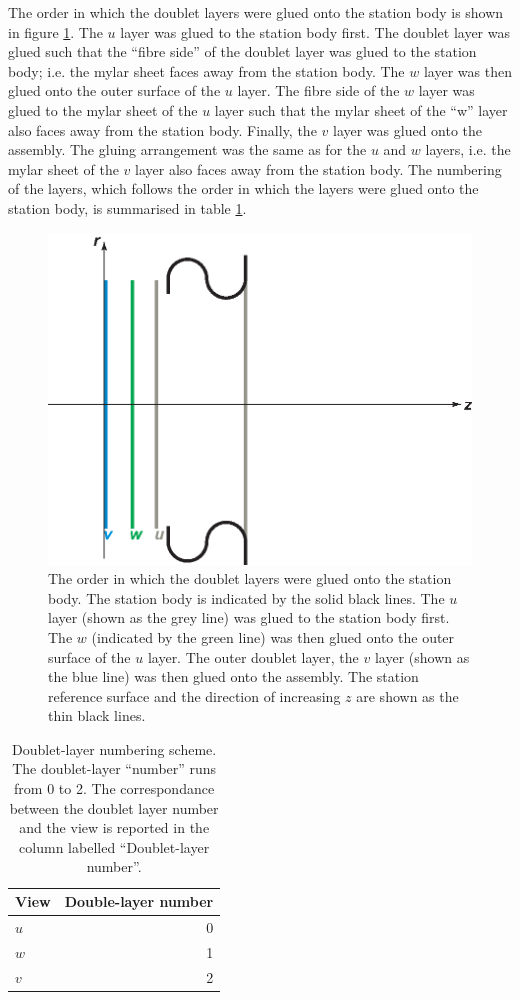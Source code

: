 The order in which the doublet layers were glued onto the station body
is shown in figure \ref{Fig:DblLyrOrder}.
The $u$ layer was glued to the station body first.
The doublet layer was glued such that the ``fibre side'' of the
doublet layer was glued to the station body; i.e. the mylar sheet
faces away from the station body.
The $w$ layer was then glued onto the outer surface of the $u$ layer.
The fibre side of the $w$ layer was glued to the mylar sheet of the
$u$ layer such that the mylar sheet of the ``w'' layer also faces away
from the station body.
Finally, the $v$ layer was glued onto the assembly.
The gluing arrangement was the same as for the $u$ and $w$ layers,
i.e. the mylar sheet of the $v$ layer also faces away from the station
body.
The numbering of the layers, which follows the order in which
the layers were glued onto the station body, is summarised in table
\ref{Tab:DblLyrOrder}.
\begin{figure}
  \begin{center}
    \includegraphics[width=0.55\linewidth]
      {02-Definitions/Figures/doublet-layer-order.eps}
  \end{center}
  \caption{
    The order in which the doublet layers were glued onto the station
    body. 
    The station body is indicated by the solid black lines.
    The $u$ layer (shown as the grey line) was glued to the station
    body first.
    The $w$ (indicated by the green line) was then glued onto the
    outer surface of the $u$ layer.
    The outer doublet layer, the $v$ layer (shown as the blue line)
    was then glued onto the assembly.
    The station reference surface and the direction of increasing $z$
    are shown as the thin black lines. 
  }
  \label{Fig:DblLyrOrder}
\end{figure}
\begin{table}
  \caption{
    Doublet-layer numbering scheme.
    The doublet-layer ``number'' runs from 0 to 2.
    The correspondance between the doublet layer number and the
    view is reported in the column labelled ``Doublet-layer number''.
  }
  \label{Tab:DblLyrOrder}
  \begin{tabular}{|l|r|}
    \hline
    {\bf View} & {\bf Double-layer number} \\
    \hline
    $u$        &                         0 \\
    $w$        &                         1 \\
    $v$        &                         2 \\
    \hline
  \end{tabular}
\end{table}

